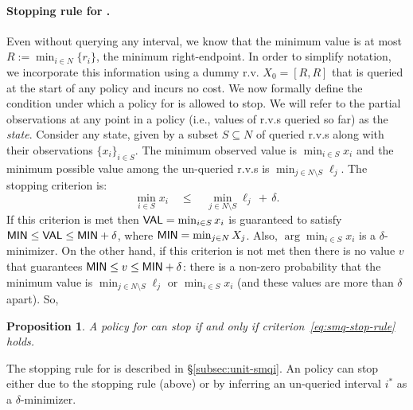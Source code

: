 \documentclass[11pt]{article}
\newtheorem{prop}[thm]{Proposition}
\theoremstyle{remark}
\theoremstyle{plain}
\theoremstyle{remark}
\begin{document}
\paragraph{Stopping rule for \smq.}  Even without querying any interval, we know that the minimum value is at most $R := \min_{i \in N}\{r_i\}$, the minimum right-endpoint. In order to simplify notation,   we incorporate this information using a dummy r.v.  $X_0 = [R,R]$   that is queried at the start of any policy and incurs no cost. 
We now formally define the  condition under which a  policy for \smq is allowed to stop. We will refer to the partial observations at any point in a policy (i.e.,  values of  r.v.s queried so far)  as the {\em state}. Consider any state, given by a subset $S\subseteq N$ of queried r.v.s along with their observations $\{x_i\}_{i\in S}$. The minimum observed value is $\min_{i\in S} x_i$ and the minimum possible value among the un-queried r.v.s is $\min_{j\in N\setminus S} \ell_j$. The stopping criterion is:
\begin{equation}
    \label{eq:smq-stop-rule}
 \min_{i\in S} x_i\quad \le \quad \min_{j\in N\setminus S} \ell_j \,+\, \delta.
 \end{equation}
If this criterion is met then ${\sf VAL}=\min_{i\in S} x_i$ is guaranteed to satisfy ${\sf MIN}\le {\sf VAL}\le {\sf MIN}+\delta$, where ${\sf MIN}=\min_{j\in N} X_j$. Also, $\arg \min_{i\in S} x_i$ is a $\delta$-minimizer. On the other hand, if this criterion is not met then there is no value $v$ that guarantees    ${\sf MIN}\le v\le {\sf MIN}+\delta$: 
there is a non-zero probability that the minimum value is  $\min_{j\in N\setminus S} \ell_j $ or  $\min_{i\in S} x_i$ (and these values are more than $\delta$ apart). So,
\begin{prop}
    A policy for \smq can stop if and only if criterion~\eqref{eq:smq-stop-rule} holds. 
\end{prop}

The stopping rule for \smqi is described in \S\ref{subsec:unit-smqi}. An \smqi policy can stop either due to the \smq stopping rule (above) or by inferring an un-queried interval $i^*$ as a $\delta$-minimizer.  
\end{document}
